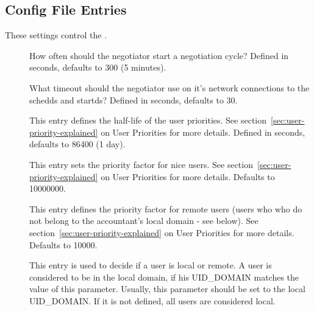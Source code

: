 \subsection{\label{sec:Negotiator-Config-File-Entries}
 Config File Entries}

These settings control the .
\begin{description}
  
\item[] \label{param:NegotiatorInterval}
  How often should the negotiator start a negotiation cycle?  Defined
  in seconds, defaults to 300 (5 minutes).
  
\item[] \label{param:NegotiatorTimeout}
  What timeout should the negotiator use on it's network connections
  to the schedds and startds?  Defined in seconds, defaults to 30.
  
\item[] \label{param:PriorityHalfLife} This
  entry defines the half-life of the user priorities.  See
  section~\ref{sec:user-priority-explained}
  on User Priorities for more details.  Defined in seconds, defaults
  to 86400 (1 day).

\item[] \label{param:NiceUserPrioFactor} 
  This entry sets the priority factor for nice users. See
  section~\ref{sec:user-priority-explained}
  on User Priorities for more details.  Defaults to 10000000.

\item[] \label{param:RemotePrioFactor} 
  This entry defines the priority factor for remote users (users who
  who do not belong to the accountant's local domain - see
  below). See section~\ref{sec:user-priority-explained}
  on User Priorities for more details.  Defaults to 10000.

\item[] \label{param:AccountantLocalDomain} 
  This entry is used to decide if a user is local or remote. A user
  is considered to be in the local domain, if his UID\_DOMAIN matches
  the value of this parameter. Usually, this parameter should be set
  to the local UID\_DOMAIN. If it is not defined, all users are considered
  local.


\end{description}
